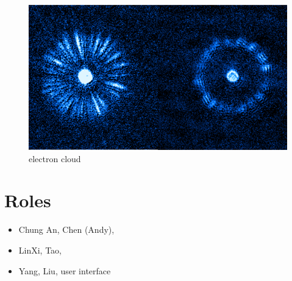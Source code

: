 \documentclass[10pt]{article}
\numberwithin{equation}{section}
\begin{document}
\begin{figure}[htbp]
  \vspace{10pt} %
  \centering
  \includegraphics[]{./concept_2.png}
  \caption{electron cloud}\label{fig2} %
\end{figure}

\section{Roles}
\begin{itemize}
    \item Chung An, Chen (Andy), 
    \item LinXi, Tao, 
    \item Yang, Liu, user interface
\end{itemize}
\end{document}
